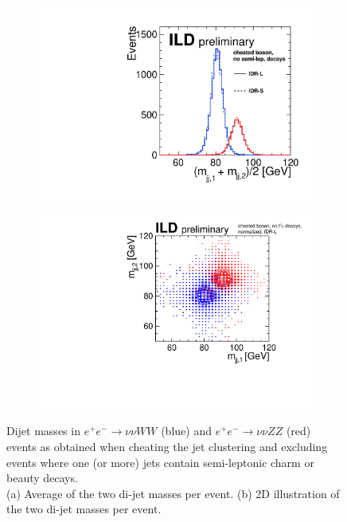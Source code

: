 \begin{figure}[htbp]
\begin{subfigure}{0.475\hsize} \includegraphics[width=\textwidth]{Performance/fig/ls_comp_icn_noSLD_monly.pdf}
 \caption{ \label{fig:qgc:cheat:1d}}
 \end{subfigure}
\begin{subfigure}{0.49\hsize} \includegraphics[width=\textwidth]{Performance/fig/m_m_icn_noSLD.pdf}
 \caption{  \label{fig:qgc:cheat:2d}}
 \end{subfigure}
\caption{Dijet masses in $e^+e^- \to \nu\nu WW$ (blue) and $e^+e^- \to \nu\nu ZZ$ (red) events as obtained when cheating the jet clustering and excluding events where one (or more) jets contain semi-leptonic charm or beauty decays.\\ 
(a) Average of the two di-jet masses per event. 
(b) 2D illustration of the two di-jet masses per event.
}
\label{fig:qgc:cheat}
\end{figure}


